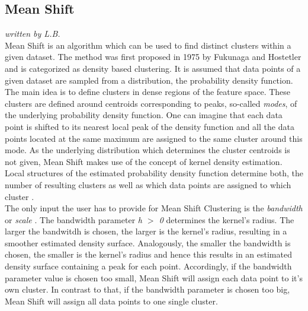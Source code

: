 \subsection{Mean Shift}
\textit{written by L.B.}\\

Mean Shift is an algorithm which can be used to find distinct clusters within a given dataset. 
The method was first proposed in 1975 by Fukunaga and Hostetler \cite{fukunaga1975estimation} and is categorized as density based clustering.
It is assumed that data points of a given dataset are sampled from a distribution, the probability density function. The main idea is to define clusters in dense regions of the feature space. These clusters are defined around centroids corresponding to peaks, so-called \textit{modes}, of the underlying probability density function. One can imagine that each data point is shifted to its nearest local peak of the density function and all the data points located at the same maximum are assigned to the same cluster around this mode. As the underlying distribution which determines the cluster centroids is not given, Mean Shift makes use of the concept of kernel density estimation. Local structures of the estimated probability density function determine both, the number of resulting clusters as well as which data points are assigned to which cluster \cite{comaniciu2002MeanShift}.  \\
The only input the user has to provide for Mean Shift Clustering is the \textit{bandwidth} or \textit{scale} \cite{scikit-learn}. The bandwidth parameter \textit{h $>$ 0} determines the kernel's radius. The larger the bandwitdh is chosen, the larger is the kernel's radius, resulting in a smoother estimated density surface. Analogously, the smaller the bandwidth is chosen, the smaller is the kernel's radius and hence this results in an estimated density surface containing a peak for each point.
Accordingly, if the bandwidth parameter value is chosen too small, Mean Shift will assign each data point to it's own cluster. In contrast to that, if the bandwidth parameter is chosen too big, Mean Shift will assign all data points to one single cluster.  


